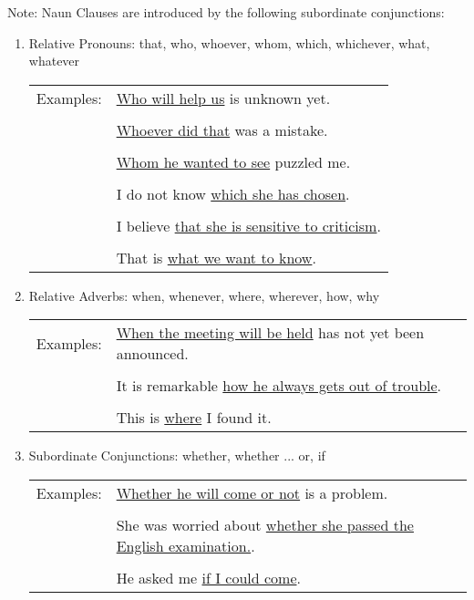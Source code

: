 Note: Naun Clauses are introduced by the following subordinate conjunctions:
\begin{enumerate}
    \item Relative Pronouns: that, who, whoever, whom, which, whichever, what,
        whatever
        \newline
        \begin{tabular}{ll}
            Examples:
            & \underline{Who will help us} is unknown yet. \\ \\
            & \underline{Whoever did that} was a mistake. \\ \\
            & \underline{Whom he wanted to see} puzzled me. \\ \\
            & I do not know \underline{which she has chosen}. \\ \\
            & I believe \underline{that she is sensitive to criticism}. \\ \\
            & That is \underline{what we want to know}.
        \end{tabular}
    \item Relative Adverbs: when, whenever, where, wherever, how, why
        \newline
        \begin{tabular}{ll}
            Examples:
            & \underline{When the meeting will be held} has not yet been
            announced. \\ \\
            & It is remarkable \underline{how he always gets out of trouble}.
            \\ \\
            & This is \underline{where} I found it.
        \end{tabular}
    \item Subordinate Conjunctions: whether, whether ... or, if
        \newline
        \begin{tabular}{ll}
            Examples:
            & \underline{Whether he will come or not} is a problem. \\ \\
            & She was worried about \underline{whether she passed the English
            examination.}. \\ \\
            & He asked me \underline{if I could come}.
        \end{tabular}
\end{enumerate}

